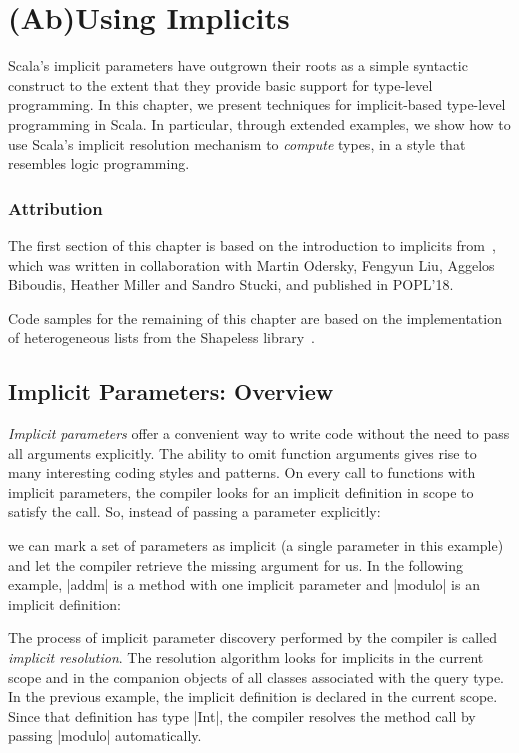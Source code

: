 \chapter{(Ab)Using Implicits}
\label{chap:ab-using-implicits}

Scala's implicit parameters have outgrown their roots as a simple syntactic construct to the extent that they provide basic support for type-level programming.
In this chapter, we present techniques for implicit-based type-level programming in Scala.
In particular, through extended examples, we show how to use Scala's implicit resolution mechanism to \emph{compute} types, in a style that resembles logic programming.

\subsection*{Attribution}

The first section of this chapter is based on the introduction to implicits from~\citep{odersky2018simplicitly}, which was written in collaboration with Martin Odersky, Fengyun Liu, Aggelos Biboudis, Heather Miller and Sandro Stucki, and published in POPL'18.

Code samples for the remaining of this chapter are based on the implementation of heterogeneous lists from the Shapeless library~\citep{sabin2011shapeless}.

\section{Implicit Parameters: Overview}

\emph{Implicit parameters} offer a convenient way to write code without the need to pass all arguments explicitly.
The ability to omit function arguments gives rise to many interesting coding styles and patterns.
On every call to functions with implicit parameters, the compiler looks for an implicit definition in scope to satisfy the call.
So, instead of passing a parameter explicitly:

\explicitModulo

\noindent
we can mark a set of parameters as implicit (a single parameter in this example) and let the compiler retrieve the missing argument for us.
In the following example, |addm| is a method with one implicit parameter and |modulo| is an implicit definition:

\implicitModulo

The process of implicit parameter discovery performed by the compiler is called \emph{implicit resolution}.
The resolution algorithm looks for implicits in the current scope and in the companion objects of all classes associated with the query type.
In the previous example, the implicit definition is declared in the current scope.
Since that definition has type |Int|, the compiler resolves the method call by passing |modulo| automatically.

